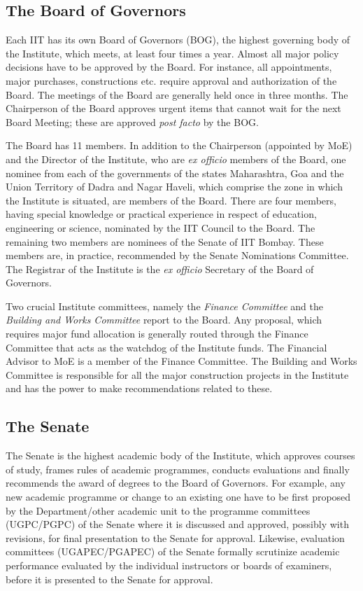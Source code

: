 \documentclass[
  10pt,
  a5paper,
  10pt,
  openany]{amsbook}
\begin{document}
\subsection{The Board of Governors}\label{the-board-of-governors}

Each IIT has its own Board of Governors (BOG), the highest governing
body of the Institute, which meets, at least four times a year. Almost
all major policy decisions have to be approved by the Board. For
instance, all appointments, major purchases, constructions etc. require
approval and authorization of the Board. The meetings of the Board are
generally held once in three months. The Chairperson of the Board
approves urgent items that cannot wait for the next Board Meeting; these
are approved \emph{post facto} by the BOG.

The Board has 11 members. In addition to the Chairperson (appointed by
MoE) and the Director of the Institute, who are \emph{ex officio}
members of the Board, one nominee from each of the governments of the
states Maharashtra, Goa and the Union Territory of Dadra and Nagar
Haveli, which comprise the zone in which the Institute is situated, are
members of the Board. There are four members, having special knowledge
or practical experience in respect of education, engineering or science,
nominated by the IIT Council to the Board. The remaining two members are
nominees of the Senate of IIT Bombay. These members are, in practice,
recommended by the Senate Nominations Committee. The Registrar of the
Institute is the \emph{ex officio} Secretary of the Board of Governors.

Two crucial Institute committees, namely the \emph{Finance Committee}
and the \emph{Building and Works Committee} report to the Board. Any
proposal, which requires major fund allocation is generally routed
through the Finance Committee that acts as the watchdog of the Institute
funds. The Financial Advisor to MoE is a member of the Finance
Committee. The Building and Works Committee is responsible for all the
major construction projects in the Institute and has the power to make
recommendations related to these.

\subsection{The Senate}\label{the-senate}

The Senate is the highest academic body of the Institute, which approves
courses of study, frames rules of academic programmes, conducts
evaluations and finally recommends the award of degrees to the Board of
Governors. For example, any new academic programme or change to an
existing one have to be first proposed by the Department/other academic
unit to the programme committees (UGPC/PGPC) of the Senate where it is
discussed and approved, possibly with revisions, for final presentation
to the Senate for approval. Likewise, evaluation committees
(UGAPEC/PGAPEC) of the Senate formally scrutinize academic performance
evaluated by the individual instructors or boards of examiners, before
it is presented to the Senate for approval.
\end{document}
